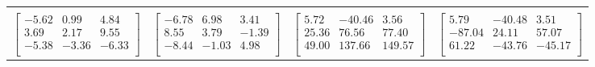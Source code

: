 \documentclass[12pt,a4paper,onesided]{report}
\begin{document}
\begin{table}[h]
{\begin{tabular}{cccc}
			\\&&&
			\\
				$\begin{bmatrix}-5.62&0.99&4.84\\3.69&2.17&9.55\\-5.38&-3.36&-6.33\\\end{bmatrix}$&
				$\begin{bmatrix}-6.78&6.98&3.41\\8.55&3.79&-1.39\\-8.44&-1.03&4.98\\\end{bmatrix}$&
				$\begin{bmatrix}5.72&-40.46&3.56\\25.36&76.56&77.40\\49.00&137.66&149.57\\\end{bmatrix}$&
				$\begin{bmatrix}5.79&-40.48&3.51\\-87.04&24.11&57.07\\61.22&-43.76&-45.17\\\end{bmatrix}$


\end{tabular}}
\end{table}
\end{document}
